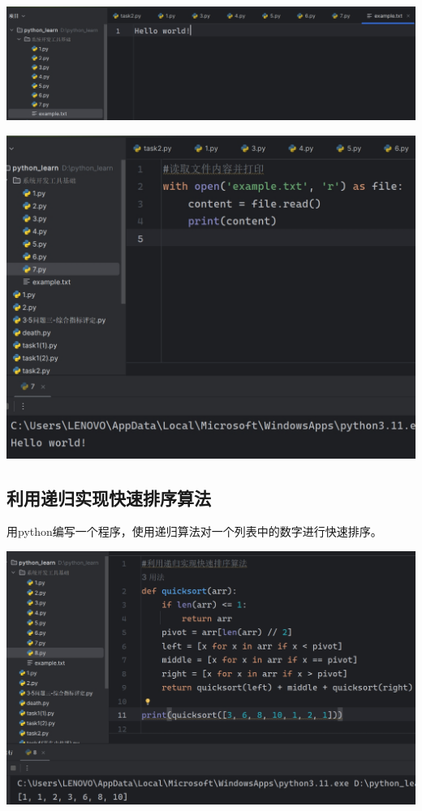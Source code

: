 \documentclass[UTF8,a4paper]{ctexart}
\begin{document}
\begin{sloppypar}
	\includegraphics[width = 16cm]{18}
	
	\includegraphics[width = 14cm]{19}
	
	\subsection{利用递归实现快速排序算法}
	用python编写一个程序，使用递归算法对一个列表中的数字进行快速排序。
	
	\includegraphics[width = 14cm]{20}
	

\end{sloppypar}
\end{document}

